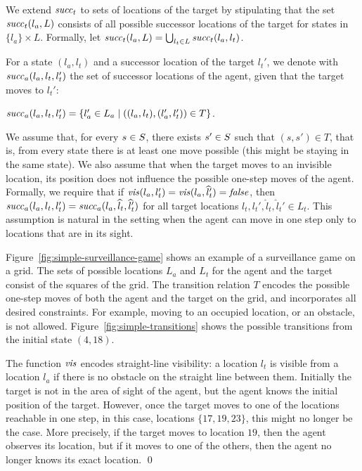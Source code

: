 We extend $\mathit{succ}_t$ to sets of locations of the target by stipulating that the set $\mathit{succ}_t(l_a,L)$ consists of all possible successor locations of the target for states in $\{l_a\} \times L$. Formally, let $\mathit{succ}_t(l_a, L) = \bigcup_{l_t \in L}\mathit{succ}_t(l_a,l_t)$.

For a state $(l_a,l_t)$ and a successor location of the target $l_t'$, we denote with $\mathit{succ}_a(l_a,l_t,l_t')$ the set of successor locations of the agent, given that the target moves to $l_t'$: 

$\mathit{succ}_a(l_a,l_t,l_t') = \{l_a' \in L_a \mid  ((l_a,l_t),(l_a',l_t')) \in T\}$.

We assume that, for every $s \in S$, there exists $s' \in S$ such that $(s,s') \in T$, that is, from every state there is at least one move possible (this might be staying in the same state). We also assume that when the target moves to an invisible location, its position does not influence the possible one-step moves of the agent. Formally, we require that if $\mathit{vis}(l_a,l_t') = \mathit{vis}(l_a,\widehat l_t')=\mathit{false}$, then $\mathit{succ}_a(l_a,l_t,l_t') = \mathit{succ}_a(l_a,\widehat l_t,\widehat l_t')$ for all target locations $l_t,l_t',\widehat l_t,\widehat l_t' \in L_t$. This assumption is natural in the setting when the agent can move in one step only to locations that are in its sight.

\begin{example}\label{ex:simple-surveillance-game}
Figure~\ref{fig:simple-surveillance-game} shows an example of a surveillance game on a grid.  The sets of possible locations $L_a$ and $L_t$ for the agent and the target consist of the squares of the  grid. The transition relation $T$ encodes the possible one-step moves of both the agent and the target on the grid, and incorporates all desired constraints. For example, moving to an occupied location, or an obstacle, is not allowed. Figure~\ref{fig:simple-transitions} shows the possible transitions from the initial state $(4,18)$.

The function $\mathit{vis}$ encodes straight-line visibility: a location $l_t$ is visible from a location $l_a$ if there is no obstacle on the straight line between them. Initially the target is not in the area of sight of the agent, but the agent knows the initial position of the target. However, once the target moves to one of the locations reachable in one step, in this case, locations $\{17,19,23\}$, this might no longer be the case. More precisely, if the target moves to location $19$, then the agent observes its location, but if it moves to one of the others, then the agent no longer knows its exact location. \qed
\end{example}




